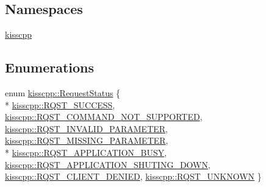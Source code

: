 \subsection*{Namespaces}
\begin{DoxyCompactItemize}
\item 
\hyperlink{a00089}{kisscpp}
\end{DoxyCompactItemize}
\subsection*{Enumerations}
\begin{DoxyCompactItemize}
\item 
enum \hyperlink{a00089_af5792fb0f68695c1a1e7a4c720d9262e}{kisscpp\-::\-Request\-Status} \{ \\*
\hyperlink{a00089_af5792fb0f68695c1a1e7a4c720d9262ea48f403b25d056ead863e1bb74664b388}{kisscpp\-::\-R\-Q\-S\-T\-\_\-\-S\-U\-C\-C\-E\-S\-S}, 
\hyperlink{a00089_af5792fb0f68695c1a1e7a4c720d9262ead080a858803c520f16f1d575431e19ec}{kisscpp\-::\-R\-Q\-S\-T\-\_\-\-C\-O\-M\-M\-A\-N\-D\-\_\-\-N\-O\-T\-\_\-\-S\-U\-P\-P\-O\-R\-T\-E\-D}, 
\hyperlink{a00089_af5792fb0f68695c1a1e7a4c720d9262ea94213a4c1e365e07fad5537b158ccd8c}{kisscpp\-::\-R\-Q\-S\-T\-\_\-\-I\-N\-V\-A\-L\-I\-D\-\_\-\-P\-A\-R\-A\-M\-E\-T\-E\-R}, 
\hyperlink{a00089_af5792fb0f68695c1a1e7a4c720d9262ea3ad7cafe8fc0329ea5edde0ebf5c807e}{kisscpp\-::\-R\-Q\-S\-T\-\_\-\-M\-I\-S\-S\-I\-N\-G\-\_\-\-P\-A\-R\-A\-M\-E\-T\-E\-R}, 
\\*
\hyperlink{a00089_af5792fb0f68695c1a1e7a4c720d9262eaa411a8dcb60e0303c992c74dd4df4f43}{kisscpp\-::\-R\-Q\-S\-T\-\_\-\-A\-P\-P\-L\-I\-C\-A\-T\-I\-O\-N\-\_\-\-B\-U\-S\-Y}, 
\hyperlink{a00089_af5792fb0f68695c1a1e7a4c720d9262ea1e1bd5f607c7cc861e2f7173253115b4}{kisscpp\-::\-R\-Q\-S\-T\-\_\-\-A\-P\-P\-L\-I\-C\-A\-T\-I\-O\-N\-\_\-\-S\-H\-U\-T\-I\-N\-G\-\_\-\-D\-O\-W\-N}, 
\hyperlink{a00089_af5792fb0f68695c1a1e7a4c720d9262eab5769a29096e43de01864a3322d45a03}{kisscpp\-::\-R\-Q\-S\-T\-\_\-\-C\-L\-I\-E\-N\-T\-\_\-\-D\-E\-N\-I\-E\-D}, 
\hyperlink{a00089_af5792fb0f68695c1a1e7a4c720d9262ea8b54c6e47b50ce90a375d79b957f5ddb}{kisscpp\-::\-R\-Q\-S\-T\-\_\-\-U\-N\-K\-N\-O\-W\-N}
 \}
\end{DoxyCompactItemize}
